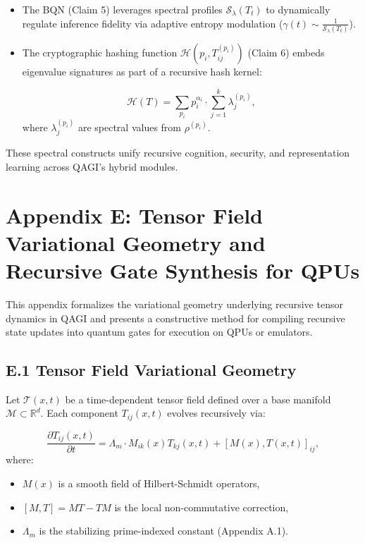 \begin{itemize}
    \item The BQN (Claim 5) leverages spectral profiles \(\mathcal{S}_\lambda(T_t)\) to dynamically regulate inference fidelity via adaptive entropy modulation (\(\gamma(t) \sim \frac{1}{\mathcal{S}_\lambda(T_t)}\)).
    
    \item The cryptographic hashing function \(\mathcal{H}(p_i, T_{ij}^{(p_i)})\) (Claim 6) embeds eigenvalue signatures as part of a recursive hash kernel:

    \[
    \mathcal{H}(T) = \sum_{p_i} p_i^{\alpha_i} \cdot \sum_{j=1}^{k} \lambda_j^{(p_i)},
    \]
    where \(\lambda_j^{(p_i)}\) are spectral values from \(\rho^{(p_i)}\).
\end{itemize}

These spectral constructs unify recursive cognition, security, and representation learning across QAGI’s hybrid modules.


\section*{Appendix E: Tensor Field Variational Geometry and Recursive Gate Synthesis for QPUs}

This appendix formalizes the variational geometry underlying recursive tensor dynamics in QAGI and presents a constructive method for compiling recursive state updates into quantum gates for execution on QPUs or emulators.

\subsection*{E.1 Tensor Field Variational Geometry}

Let \(\mathcal{T}(x,t)\) be a time-dependent tensor field defined over a base manifold \(\mathcal{M} \subset \mathbb{R}^d\). Each component \(T_{ij}(x,t)\) evolves recursively via:

\[
\frac{\partial T_{ij}(x,t)}{\partial t} = \Lambda_m \cdot M_{ik}(x) T_{kj}(x,t) + [M(x), T(x,t)]_{ij},
\]
where:
\begin{itemize}
    \item \(M(x)\) is a smooth field of Hilbert-Schmidt operators,
    \item \([M, T] = MT - TM\) is the local non-commutative correction,
    \item \(\Lambda_m\) is the stabilizing prime-indexed constant (Appendix A.1).
\end{itemize}

